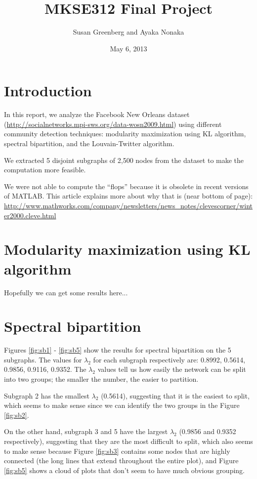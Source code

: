 \documentclass[11pt]{article}
\date{May 6, 2013}
\title{
MKSE312 Final Project
}
\author{
Susan Greenberg and Ayaka Nonaka
}
\begin{document}
\maketitle

\section{Introduction}
In this report, we analyze the Facebook New Orleans dataset (\url{http://socialnetworks.mpi-sws.org/data-wosn2009.html}) using different community detection techniques: modularity maximization using KL algorithm, spectral bipartition, and the Louvain-Twitter algorithm.

We extracted 5 disjoint subgraphs of 2,500 nodes from the dataset to make the computation more feasible.

We were not able to compute the ``flops'' because it is obsolete in recent versions of MATLAB. This article explains more about why that is (near bottom of page): \url{http://www.mathworks.com/company/newsletters/news_notes/clevescorner/winter2000.cleve.html}

\section{Modularity maximization using KL algorithm}
Hopefully we can get some results here...

\section{Spectral bipartition}
Figures \ref{fig:sb1} - \ref{fig:sb5} show the results for spectral bipartition on the 5 subgraphs. The values for $\lambda_2$ for each subgraph respectively are: 0.8992, 0.5614, 0.9856, 0.9116, 0.9352. The $\lambda_2$ values tell us how easily the network can be split into two groups; the smaller the number, the easier to partition.

Subgraph 2 has the smallest $\lambda_2$ (0.5614), suggesting that it is the easiest to split, which seems to make sense since we can identify the two groups in the Figure \ref{fig:sb2}.

On the other hand, subgraph 3 and 5 have the largest $\lambda_2$ (0.9856 and 0.9352 respectively), suggesting that they are the most difficult to split, which also seems to make sense because Figure \ref{fig:sb3} contains some nodes that are highly connected (the long lines that extend throughout the entire plot), and Figure \ref{fig:sb5} shows a cloud of plots that don't seem to have much obvious grouping.
\end{document}
